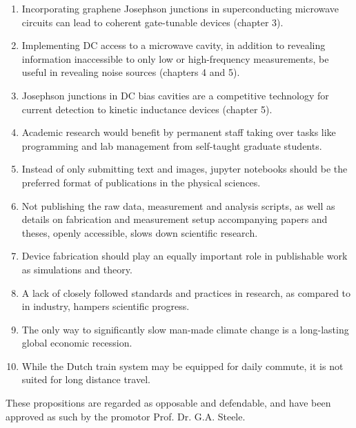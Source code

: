 \documentclass{dissertation-edit}
\begin{document}
\begin{enumerate}

\item Incorporating graphene Josephson junctions in superconducting microwave circuits can lead to coherent gate-tunable devices (chapter 3).
%
\item Implementing DC access to a microwave cavity, in addition to revealing information inaccessible to only low or high-frequency measurements, be useful in revealing noise sources (chapters 4 and 5).
%
\item Josephson junctions in DC bias cavities are a competitive technology for current detection to kinetic inductance devices (chapter 5).
%
\item Academic research would benefit by permanent staff taking over tasks like programming and lab management from self-taught graduate students.
%
\item Instead of only submitting text and images, jupyter notebooks should be the preferred format of publications in the physical sciences.
%
\item Not publishing the raw data, measurement and analysis scripts, as well as details on fabrication and measurement setup accompanying papers and theses, openly accessible, slows down scientific research.
%
\item Device fabrication should play an equally important role in publishable work as simulations and theory.
%
\item A lack of closely followed standards and practices in research, as compared to in industry, hampers scientific progress.
%
\item The only way to significantly slow man-made climate change is a long-lasting global economic recession.
%
\item While the Dutch train system may be equipped for daily commute, it is not suited for long distance travel.

\end{enumerate}

\bigskip
\bigskip

\begin{center}
These propositions are regarded as opposable and defendable, and have been approved as such by the promotor Prof. Dr. G.A. Steele.
\end{center}
\end{document}
